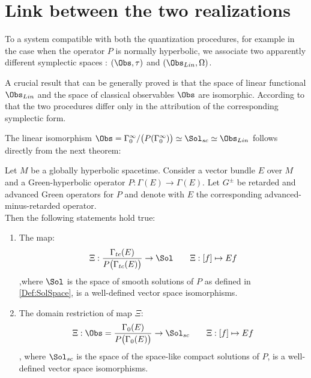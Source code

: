 \documentclass[Main]{subfiles}
\begin{document}
\section{Link between the two realizations}	\label{Section:LinkBetweenQuantization}
	To a system compatible with both the quantization procedures, for example in the case when the operator $P$ is normally hyperbolic, we associate two apparently different symplectic spaces : $(\Obs,\tau)$ and $(\Obs_{Lin},\Omega)$.
	
	A crucial result that can be generally proved is that the space of linear functional $\Obs_{Lin}$ and the space of classical observables $\Obs$ are isomorphic.
	According to that the two procedures differ only in the attribution of the corresponding symplectic form.

	The linear isomorphism $\Obs = \Gamma_0^\infty / \big( P ( \Gamma_0^\infty) \big) \simeq \Sol_{sc} \simeq \Obs_{Lin}$ follows directly from the next theorem:
	\begin{theorem}\label{Teo:IsomorphismBetweenTheTwoSymplectic}
					Let $M$ be a globally hyperbolic spacetime. Consider a vector bundle $E$ over $M$ and a Green-hyperbolic operator $P: \Gamma(E)\rightarrow \Gamma(E)$.
				Let $G^\pm$ be retarded and advanced Green operators for $P$ and denote with $E$ the corresponding advanced-minus-retarded operator.\\
				Then the following statements hold true:
					\begin{enumerate}
						\item The map:
							\begin{equation}
								 \Xi : \frac{\Gamma_{tc}(E)}{P \big( \Gamma_{tc}(E)\big)} \rightarrow  \Sol \qquad \Xi: [f] \mapsto E f
							\end{equation}
							,where $\Sol$ is the space of smooth solutions of $P$ as defined in \ref{Def:SolSpace},
							is a well-defined vector space isomorphisms.
						\item The domain restriction of map $\Xi$:
							\begin{equation}
								 \Xi : \Obs= \frac{\Gamma_{0}(E)}{P \big( \Gamma_{0}(E)\big)} \rightarrow  \Sol_{sc} \qquad \Xi: [f] \mapsto E f
							\end{equation}
							, where $\Sol_{sc}$ is the space of the space-like compact solutions of $P$,
							is a well-defined vector space isomorphisms.
					\end{enumerate}
	\end{theorem}
\end{document}
